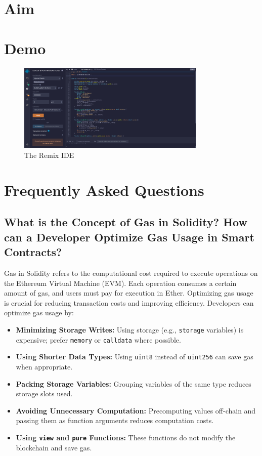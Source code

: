 \documentclass[11pt]{article}
\begin{document}
\tableofcontents
\thispagestyle{empty}
\clearpage

\setcounter{page}{1}

\section{Aim}

\section{Demo}

\begin{figure}[H]
    \centering
    \includegraphics[width=0.8\textwidth]{dg8cf.png}
    \caption{The Remix IDE}
    \label{fig:1}
\end{figure}

\section{Frequently Asked Questions}

\subsection{What is the Concept of Gas in Solidity? How can a Developer Optimize Gas Usage in Smart Contracts?}

Gas in Solidity refers to the computational cost required to execute operations on the Ethereum Virtual Machine (EVM). Each operation consumes a certain amount of gas, and users must pay for execution in Ether. Optimizing gas usage is crucial for reducing transaction costs and improving efficiency. Developers can optimize gas usage by:

\begin{itemize}
    \item \textbf{Minimizing Storage Writes:} Using storage (e.g., \texttt{storage} variables) is expensive; prefer \texttt{memory} or \texttt{calldata} where possible.
    \item \textbf{Using Shorter Data Types:} Using \texttt{uint8} instead of \texttt{uint256} can save gas when appropriate.
    \item \textbf{Packing Storage Variables:} Grouping variables of the same type reduces storage slots used.
    \item \textbf{Avoiding Unnecessary Computation:} Precomputing values off-chain and passing them as function arguments reduces computation costs.
    \item \textbf{Using \texttt{view} and \texttt{pure} Functions:} These functions do not modify the blockchain and save gas.
\end{itemize}
\end{document}
